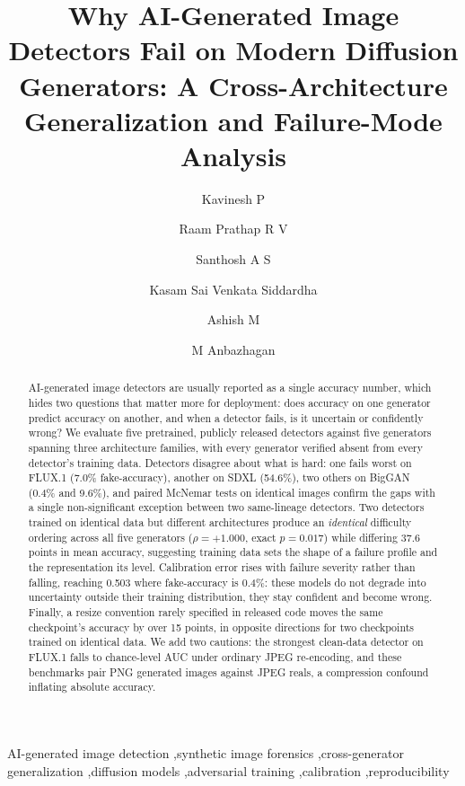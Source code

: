 \documentclass[3p,times,procedia]{elsarticle}
\begin{document}
\begin{frontmatter}


\title{Why AI-Generated Image Detectors Fail on Modern Diffusion Generators: A Cross-Architecture Generalization and Failure-Mode Analysis}

\author[a]{Kavinesh P}
\author[a]{Raam Prathap R V}
\author[a]{Santhosh A S}
\author[a]{Kasam Sai Venkata Siddardha}
\author[a]{Ashish M}
\author[a]{M Anbazhagan}

\address[a]{Department of Computer Science and Engineering, Amrita School of Computing, Coimbatore 641112, Amrita Vishwa Vidyapeetham, India}

\begin{abstract}
AI-generated image detectors are usually reported as a single accuracy
number, which hides two questions that matter more for deployment: does
accuracy on one generator predict accuracy on another, and when a detector
fails, is it uncertain or confidently wrong? We evaluate five pretrained,
publicly released detectors against five generators spanning three
architecture families, with every generator verified absent from every
detector's training data. Detectors disagree about what is hard: one fails
worst on FLUX.1 (7.0\% fake-accuracy), another on SDXL (54.6\%), two others
on BigGAN (0.4\% and 9.6\%), and paired McNemar tests on identical images
confirm the gaps with a single non-significant exception between two
same-lineage detectors. Two detectors trained on identical data but
different architectures produce an \emph{identical} difficulty ordering
across all five generators ($\rho=+1.000$, exact $p=0.017$) while differing
37.6 points in mean accuracy, suggesting training data sets the shape of a
failure profile and the representation its level. Calibration error rises
with failure severity rather than falling, reaching 0.503 where
fake-accuracy is 0.4\%: these models do not degrade into uncertainty
outside their training distribution, they stay confident and become wrong.
Finally, a resize convention rarely specified in released code moves the
same checkpoint's accuracy by over 15 points, in opposite directions for
two checkpoints trained on identical data. We add two cautions: the
strongest clean-data detector on FLUX.1 falls to chance-level AUC under
ordinary JPEG re-encoding, and these benchmarks pair PNG generated images
against JPEG reals, a compression confound inflating absolute accuracy.
\end{abstract}

\begin{keyword}
AI-generated image detection \sep synthetic image forensics \sep cross-generator generalization \sep diffusion models \sep adversarial training \sep calibration \sep reproducibility
\end{keyword}
\end{frontmatter}
\end{document}
